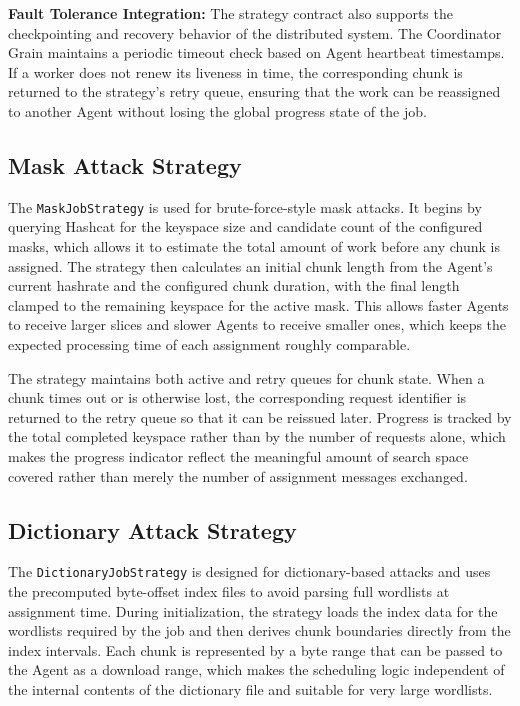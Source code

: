 \textbf{Fault Tolerance Integration:} The strategy contract also supports the checkpointing and recovery behavior of the distributed system. The Coordinator Grain maintains a periodic timeout check based on Agent heartbeat timestamps. If a worker does not renew its liveness in time, the corresponding chunk is returned to the strategy's retry queue, ensuring that the work can be reassigned to another Agent without losing the global progress state of the job.

\subsection{Mask Attack Strategy}

The \verb|MaskJobStrategy| is used for brute-force-style mask attacks. It begins by querying Hashcat for the keyspace size and candidate count of the configured masks, which allows it to estimate the total amount of work before any chunk is assigned. The strategy then calculates an initial chunk length from the Agent's current hashrate and the configured chunk duration, with the final length clamped to the remaining keyspace for the active mask. This allows faster Agents to receive larger slices and slower Agents to receive smaller ones, which keeps the expected processing time of each assignment roughly comparable.

The strategy maintains both active and retry queues for chunk state. When a chunk times out or is otherwise lost, the corresponding request identifier is returned to the retry queue so that it can be reissued later. Progress is tracked by the total completed keyspace rather than by the number of requests alone, which makes the progress indicator reflect the meaningful amount of search space covered rather than merely the number of assignment messages exchanged.

\subsection{Dictionary Attack Strategy}

The \verb|DictionaryJobStrategy| is designed for dictionary-based attacks and uses the precomputed byte-offset index files to avoid parsing full wordlists at assignment time. During initialization, the strategy loads the index data for the wordlists required by the job and then derives chunk boundaries directly from the index intervals. Each chunk is represented by a byte range that can be passed to the Agent as a download range, which makes the scheduling logic independent of the internal contents of the dictionary file and suitable for very large wordlists.

